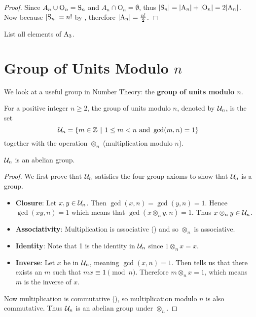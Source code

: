 \begin{proof}
    Since $A_n \cup \mathrm{O}_n = \mathrm{S}_{n}$ and $A_n \cap \mathrm{O}_n = \emptyset$, thus $|\mathrm{S}_{n}| = |\mathrm{A}_{n}| + |\mathrm{O}_n| = 2|\mathrm{A}_{n}|$. Now because $|\mathrm{S}_{n}| = n!$ by , therefore $|\mathrm{A}_{n}| = \frac{n!}2$.
\end{proof}

\begin{exercise}
    List all elements of $\mathrm{A}_{3}$.
\end{exercise}

\section{Group of Units Modulo $n$}\label{section-group-of-units-mod-n}
We look at a useful group in Number Theory: the \textbf{group of units modulo $n$}.

\begin{definition}
    For a positive integer $n \geq 2$, the group of units modulo $n$, denoted by $\mathcal{U}_{n}$, is the set
    \[
        \Un{n} = \{m \in \Z \vert 1 \leq m < n \text{ and } \gcd(m, n) = 1\}
    \]
    together with the operation $\otimes_n$ (multiplication modulo $n$).
\end{definition}

\begin{proposition}
    $\mathcal{U}_{n}$ is an abelian group.
\end{proposition}
\begin{proof}
    We first prove that $\mathcal{U}_{n}$ satisfies the four group axioms to show that $\mathcal{U}_{n}$ is a group.
    \begin{itemize}
        \item \textbf{Closure}: Let $x, y \in \mathcal{U}_{n}$. Then $\gcd(x, n) = \gcd(y, n) = 1$. Hence $\gcd(xy, n) = 1$ which means that $\gcd(x\otimes_ny,n)=1$. Thus $x\otimes_ny \in \mathcal{U}_{n}$.

        \item \textbf{Associativity}: Multiplication is associative () and so $\otimes_n$ is associative.

        \item \textbf{Identity}: Note that 1 is the identity in $\mathcal{U}_{n}$ since $1 \otimes_n x = x$.

        \item \textbf{Inverse}: Let $x$ be in $\mathcal{U}_{n}$, meaning $\gcd(x, n) = 1$. Then  tells us that there exists an $m$ such that $mx \equiv 1 \pmod n$. Therefore $m \otimes_n x = 1$, which means $m$ is the inverse of $x$.
    \end{itemize}
    Now multiplication is commutative (), so multiplication modulo $n$ is also commutative. Thus $\mathcal{U}_{n}$ is an abelian group under $\otimes_n$.
\end{proof}

